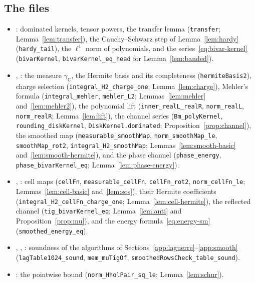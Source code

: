 \documentclass[11pt,reqno]{amsart}
\theoremstyle{definition}
\numberwithin{equation}{section}
\newcommand{\C}{\mathbb{C}}
\newcommand{\gC}{\gamma_{\C}}
\begin{document}
\subsection{The files}
\begin{itemize}\raggedright
  \item {}: dominated kernels, tensor powers, the transfer lemma (\texttt{transfer}; Lemma~\ref{lem:transfer}), the Cauchy--Schwarz step of Lemma~\ref{lem:hardy} (\texttt{hardy\_tail}), the $\ell^1$ norm of polynomials, and the series~\eqref{eq:bivar-kernel} (\texttt{bivarKernel}, \texttt{bivarKernel\_eq\_head} for Lemma~\ref{lem:banded}).
  \item {}, : the measure $\gC$, the Hermite basis and its completeness (\texttt{hermiteBasis2}), charge selection (\texttt{integral\_H2\_charge\_one}; Lemma~\ref{lem:charge}), Mehler's formula (\texttt{integral\_mehler}, \texttt{mehler\_L2}; Lemmas~\ref{lem:mehler} and~\ref{lem:mehler2}), the polynomial lift (\texttt{inner\_realL\_realR}, \texttt{norm\_realL}, \texttt{norm\_realR}; Lemma~\ref{lem:lift}), the channel series (\texttt{Bm\_polyKernel}, \texttt{rounding\_diskKernel}, \texttt{DiskKernel.dominated}; Proposition~\ref{prop:channel}), the smoothed map (\texttt{measurable\_smoothMap}, \texttt{norm\_smoothMap\_le}, \texttt{smoothMap\_rot2}, \texttt{integral\_H2\_smoothMap}; Lemmas~\ref{lem:smooth-basic} and~\ref{lem:smooth-hermite}), and the phase channel (\texttt{phase\_energy}, \texttt{phase\_bivarKernel\_eq}; Lemma~\ref{lem:phase-energy}).
  \item {}, : cell maps (\texttt{cellFn}, \texttt{measurable\_cellFn}, \texttt{cellFn\_rot2}, \texttt{norm\_cellFn\_le}; Lemmas~\ref{lem:cell-basic} and~\ref{lem:sos}), their Hermite coefficients (\texttt{integral\_H2\_cellFn\_charge\_one}; Lemma~\ref{lem:cell-hermite}), the reflected channel (\texttt{tig\_bivarKernel\_eq}; Lemma~\ref{lem:anti} and Proposition~\ref{prop:mu}), and the energy formula~\eqref{eq:energy-sm} (\texttt{smoothed\_energy\_eq}).
  \item {}, , : soundness of the algorithms of Sections~\ref{app:laguerre}--\ref{app:smooth} (\texttt{lagTable1024\_sound}, \texttt{mem\_muTigOf}, \texttt{smoothedRowsCheck\_table\_sound}).
  \item {}: the pointwise bound (\texttt{norm\_HholPair\_sq\_le}; Lemma~\ref{lem:schur}).

\end{itemize}
\end{document}
